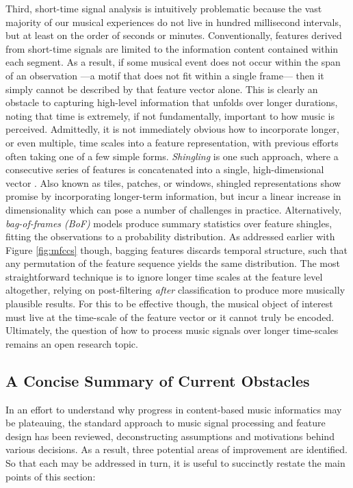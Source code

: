 Third, short-time signal analysis is intuitively problematic because the vast majority of our musical experiences do not live in hundred millisecond intervals, but at least on the order of seconds or minutes.
Conventionally, features derived from short-time signals are limited to the information content contained within each segment.
As a result, if some musical event does not occur within the span of an observation ---a motif that does not fit within a single frame--- then it simply cannot be described by that feature vector alone.
This is clearly an obstacle to capturing high-level information that unfolds over longer durations, noting that time is extremely, if not fundamentally, important to how music is perceived.
Admittedly, it is not immediately obvious how to incorporate longer, or even multiple, time scales into a feature representation, with previous efforts often taking one of a few simple forms.
\emph{Shingling} is one such approach, where a consecutive series of features is concatenated into a single, high-dimensional vector \cite{Casey2008Analysis}.
Also known as tiles, patches, or windows, shingled representations show promise by incorporating longer-term information, but incur a linear increase in dimensionality which can pose a number of challenges in practice.
Alternatively, \emph{bag-of-frames (BoF)} models produce summary statistics over feature shingles, fitting the observations to a probability distribution.
As addressed earlier with Figure \ref{fig:mfccs} though, bagging features discards temporal structure, such that any permutation of the feature sequence yields the same distribution.
The most straightforward technique is to ignore longer time scales at the feature level altogether, relying on post-filtering \emph{after} classification to produce more musically plausible results.
For this to be effective though, the musical object of interest must live at the time-scale of the feature vector or it cannot truly be encoded.
Ultimately, the question of how to process music signals over longer time-scales remains an open research topic.



\subsection{A Concise Summary of Current Obstacles}
\label{subsec:obstacles}
In an effort to understand why progress in content-based music informatics may be plateauing, the standard approach to music signal processing and feature design has been reviewed, deconstructing assumptions and motivations behind various decisions.
As a result, three potential areas of improvement are identified.
So that each may be addressed in turn, it is useful to succinctly restate the main points of this section:

